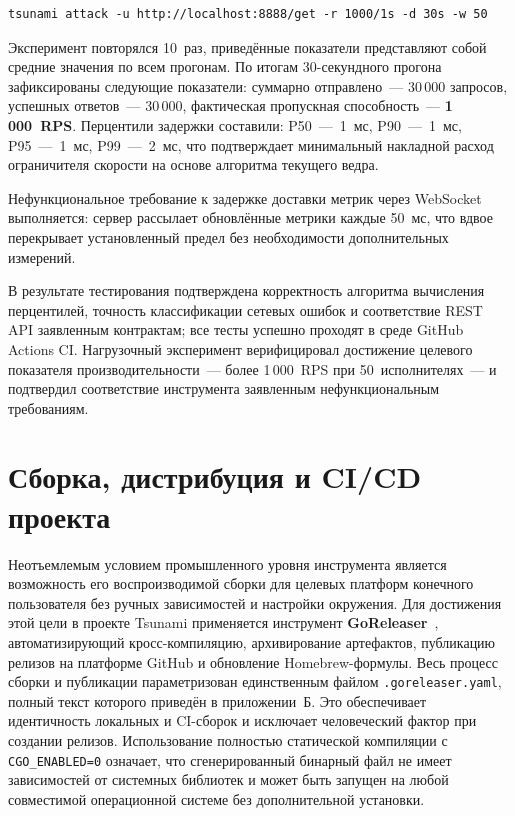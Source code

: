 \begin{lstlisting}[caption={Команда нагрузочного теста для оценки производительности},label={lst:perftest}]
tsunami attack -u http://localhost:8888/get -r 1000/1s -d 30s -w 50
\end{lstlisting}

Эксперимент повторялся 10~раз, приведённые показатели представляют собой средние значения по всем прогонам.
По итогам 30-секундного прогона зафиксированы следующие показатели:
суммарно отправлено~--- 30\,000 запросов,
успешных ответов~--- 30\,000,
фактическая пропускная способность~--- \textbf{1\,000~RPS}.
Перцентили задержки составили:
P50~---~1~мс, P90~---~1~мс, P95~---~1~мс, P99~---~2~мс,
что подтверждает минимальный накладной расход ограничителя скорости
на основе алгоритма текущего ведра.

Нефункциональное требование к задержке доставки метрик через WebSocket выполняется:
сервер рассылает обновлённые метрики каждые 50~мс,
что вдвое перекрывает установленный предел
без необходимости дополнительных измерений.

В результате тестирования подтверждена корректность алгоритма вычисления перцентилей, точность классификации сетевых ошибок и соответствие REST API заявленным контрактам; все тесты успешно проходят в среде GitHub Actions CI.
Нагрузочный эксперимент верифицировал достижение целевого показателя
производительности~--- более 1\,000~RPS при 50~исполнителях~--- и подтвердил
соответствие инструмента заявленным нефункциональным требованиям.


\section{Сборка, дистрибуция и CI/CD проекта}

Неотъемлемым условием промышленного уровня инструмента является возможность его воспроизводимой сборки для целевых платформ конечного пользователя без ручных зависимостей и настройки окружения.
Для достижения этой цели в проекте Tsunami применяется инструмент \textbf{GoReleaser}~\cite{goreleaser}, автоматизирующий кросс-компиляцию, архивирование артефактов, публикацию релизов на платформе GitHub и обновление Homebrew-формулы.
Весь процесс сборки и публикации параметризован единственным файлом \texttt{.goreleaser.yaml}, полный текст которого приведён в приложении~Б.
Это обеспечивает идентичность локальных и CI-сборок и исключает человеческий фактор при создании релизов.
Использование полностью статической компиляции с \texttt{CGO\_ENABLED=0} означает, что сгенерированный бинарный файл не имеет зависимостей от системных библиотек и может быть запущен на любой совместимой операционной системе без дополнительной установки.

